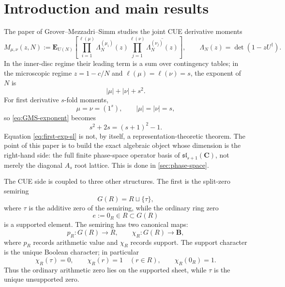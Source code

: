 \documentclass[11pt]{article}
\newcommand{\C}{\mathbf C}
\newcommand{\B}{\mathbf B}
\newcommand{\1}{\mathbf 1}
\numberwithin{equation}{section}
\begin{document}
\section{Introduction and main results}

The paper of Grover--Mezzadri--Simm studies the joint CUE derivative moments
\begin{equation}\label{eq:GMS-moment}
  M_{\mu,\nu}(z,N)
  :=\mathbf E_{U(N)}\left[\prod_{i=1}^{\ell(\mu)}\Lambda_N^{(\mu_i)}(z)
  \prod_{j=1}^{\ell(\nu)}\overline{\Lambda_N^{(\nu_j)}(z)}\right],
  \qquad \Lambda_N(z)=\det(1-zU^\dagger).
\end{equation}
In the inner-disc regime their leading term is a sum over contingency tables; in the microscopic regime $z=1-c/N$ and $\ell(\mu)=\ell(\nu)=s$, the exponent of $N$ is
\begin{equation}\label{eq:GMS-exponent}
  |\mu|+|\nu|+s^2.
\end{equation}
For first derivative $s$-fold moments,
\begin{equation}
  \mu=\nu=(1^s),\qquad |\mu|=|\nu|=s,
\end{equation}
so \eqref{eq:GMS-exponent} becomes
\begin{equation}\label{eq:first-exp-sl}
  s^2+2s=(s+1)^2-1.
\end{equation}
Equation \eqref{eq:first-exp-sl} is not, by itself, a representation-theoretic theorem.  The point of this paper is to build the exact algebraic object whose dimension is the right-hand side: the full finite phase-space operator basis of $\mathfrak{sl}_{s+1}(\C)$, not merely the diagonal $A_s$ root lattice.  This is done in \cref{sec:phase-space}.

The CUE side is coupled to three other structures.  The first is the split-zero semiring
\begin{equation}\label{eq:GR-def-intro}
  G(R)=R\sqcup\{\tau\},
\end{equation}
where $\tau$ is the additive zero of the semiring, while the ordinary ring zero
\begin{equation}
  e:=0_R\in R\subset G(R)
\end{equation}
is a supported element.  The semiring has two canonical maps:
\begin{equation}
  p_R:G(R)\to R,
  \qquad
  \chi_R:G(R)\to\B,
\end{equation}
where $p_R$ records arithmetic value and $\chi_R$ records support.  The support character is the unique Boolean character; in particular
\begin{equation}
  \chi_R(\tau)=0,
  \qquad
  \chi_R(r)=1\quad(r\in R),
  \qquad
  \chi_R(0_R)=1.
\end{equation}
Thus the ordinary arithmetic zero lies on the supported sheet, while $\tau$ is the unique unsupported zero.
\end{document}
